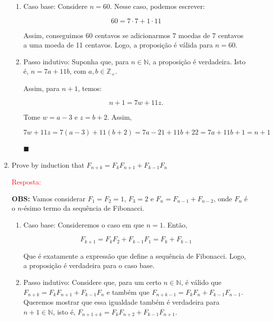 \documentclass{article}
\newcommand*{\QEDA}{\hfill\ensuremath{\blacksquare}}%
\begin{document}
\begin{enumerate}
\begin{enumerate}[itemsep=0pt, label=(\roman*)]
    \item Caso base: Considere $n = 60$. Nesse caso, podemos escrever:
    
    \begin{equation*}
        60 = 7\cdot 7 + 1 \cdot 11
    \end{equation*}
    
    Assim, conseguimos 60 centavos se adicionarmos 7 moedas de 7 centavos a uma moeda de 11 centavos. Logo, a proposição é válida para $n=60$. 
    
    \item Passo indutivo: Suponha que, para $n \in \mathbb{N}$, a proposição é verdadeira. Isto é, $n = 7a + 11b$, com $a,b \in \mathbb{Z}_{+}$. 
    
    Assim, para $n+1$, temos: 
    
    \begin{equation*}
        n+1 = 7w+11z.
    \end{equation*}
    
    Tome $w = a-3$ e $z = b+2$. Assim, 
    
    \begin{equation*}
        7w+11z = 7(a-3)+11(b+2)=7a-21+11b+22 = 7a+11b+1 = n+1
    \end{equation*}
    
    \QEDA
    \end{enumerate}
    
  \item Prove by induction that $F_{n+k}=F_{k}F_{n+1}+F_{k-1}F_{n}$
    
    \textcolor{red}{Resposta: }
    
    \textbf{OBS:} Vamos considerar $F_1=F_2=1$, $F_3 = 2$ e $F_n = F_{n-1}+F_{n-2}$, onde $F_n$ é o $n$-ésimo termo da sequência de Fibonacci. 
    
    \begin{enumerate}[itemsep=0pt, label=(\roman*)]
    
    \item Caso base: Consideremos o caso em que $n=1$. Então, 
    
    \begin{equation*}
        F_{k+1}=F_{k}F_{2}+F_{k-1}F_{1} = F_k + F_{k-1}
    \end{equation*}
    
    Que é exatamente a expressão que define a sequência de Fibonacci. Logo, a proposição é verdadeira para o caso base. 
    
    \item Passo indutivo: Considere que, para um certo $n \in \mathbb{N}$, é válido que $F_{n+k}=F_{k}F_{n+1}+F_{k-1}F_{n}$ e também que $F_{n+k-1}=F_{k}F_{n}+F_{k-1}F_{n-1}$. Queremos mostrar que essa igualdade também é verdadeira para $n+1 \in \mathbb{N}$, isto é, $F_{n+1+k}=F_{k}F_{n+2}+F_{k-1}F_{n+1}$. 
    

\end{enumerate}
\end{enumerate}
\end{document}
